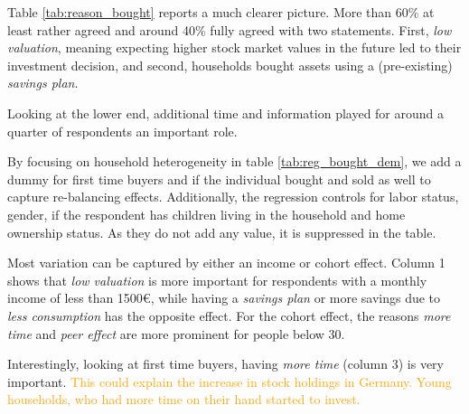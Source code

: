 \documentclass[ProjectABM]{subfiles}
\begin{document}


Table \ref{tab:reason_bought} reports a much clearer picture. More than 60\% at least rather agreed and around 40\% fully agreed with two statements. First, \textit{low valuation}, meaning expecting higher stock market values in the future led to their investment decision, and second, households bought assets using a (pre-existing) \textit{savings plan}. %

Looking at the lower end, additional time and information played for around a quarter of respondents an important role. %



By focusing on household heterogeneity in table \ref{tab:reg_bought_dem}, we add a dummy for first time buyers and if the individual bought and sold as well to capture re-balancing effects. Additionally, the regression controls for labor status, gender, if the respondent has children living in the household and home ownership status. As they do not add any value, it is suppressed in the table.

Most variation can be captured by either an income or cohort effect. Column 1 shows that \textit{low valuation} is more important for respondents with a monthly income of less than 1500\euro, while having a \textit{savings plan} or more savings due to \textit{less consumption} has the opposite effect. For the cohort effect, the reasons \textit{more time} and \textit{peer effect} are more prominent for people below 30.

Interestingly, looking at first time buyers, having \textit{more time} (column 3) is very important. \textcolor{orange}{This could explain the increase in stock holdings in Germany. Young households, who had more time on their hand started to invest.}
\end{document}
